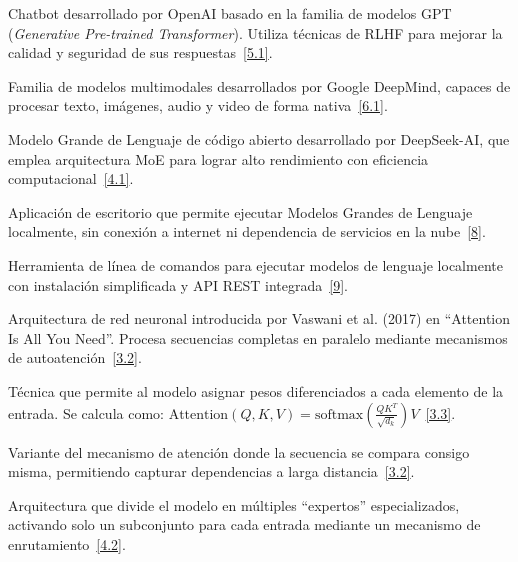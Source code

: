 \documentclass[12pt,a4paper]{report}
\numberwithin{figure}{section}
\begin{document}
\begin{description}[style=nextline, leftmargin=1.5cm, labelwidth=1.3cm]
\item[\textbf{ChatGPT:}] \label{glos:chatgpt} Chatbot desarrollado por OpenAI basado en la familia de modelos GPT (\textit{Generative Pre-trained Transformer}). Utiliza técnicas de RLHF para mejorar la calidad y seguridad de sus respuestas~\hyperref[ref:5]{[5.1]}.

\item[\textbf{Gemini:}] \label{glos:gemini} Familia de modelos multimodales desarrollados por Google DeepMind, capaces de procesar texto, imágenes, audio y video de forma nativa~\hyperref[ref:6]{[6.1]}.

\item[\textbf{DeepSeek:}] \label{glos:deepseek} Modelo Grande de Lenguaje de código abierto desarrollado por DeepSeek-AI, que emplea arquitectura MoE para lograr alto rendimiento con eficiencia computacional~\hyperref[ref:4]{[4.1]}.

\item[\textbf{LM Studio:}] \label{glos:lmstudio} Aplicación de escritorio que permite ejecutar Modelos Grandes de Lenguaje localmente, sin conexión a internet ni dependencia de servicios en la nube~\hyperref[ref:8]{[8]}.

\item[\textbf{Ollama:}] \label{glos:ollama} Herramienta de línea de comandos para ejecutar modelos de lenguaje localmente con instalación simplificada y API REST integrada~\hyperref[ref:9]{[9]}.

\item[\textbf{Transformer:}] \label{glos:transformer} Arquitectura de red neuronal introducida por Vaswani et al. (2017) en ``Attention Is All You Need''. Procesa secuencias completas en paralelo mediante mecanismos de autoatención~\hyperref[ref:3]{[3.2]}.

\item[\textbf{Mecanismo de Atención (\textit{Attention}):}] \label{glos:attention} Técnica que permite al modelo asignar pesos diferenciados a cada elemento de la entrada. Se calcula como: $\text{Attention}(Q, K, V) = \text{softmax}\left(\frac{QK^T}{\sqrt{d_k}}\right)V$~\hyperref[ref:3]{[3.3]}.

\item[\textbf{Autoatención (\textit{Self-Attention}):}] \label{glos:selfattention} Variante del mecanismo de atención donde la secuencia se compara consigo misma, permitiendo capturar dependencias a larga distancia~\hyperref[ref:3]{[3.2]}.

\item[\textbf{MoE (\textit{Mixture of Experts}):}] \label{glos:moe} Arquitectura que divide el modelo en múltiples ``expertos'' especializados, activando solo un subconjunto para cada entrada mediante un mecanismo de enrutamiento~\hyperref[ref:4]{[4.2]}.


\end{description}
\end{document}
